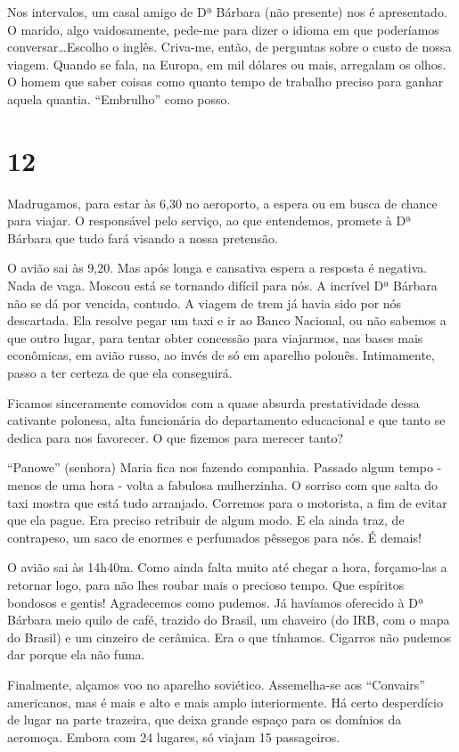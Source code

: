 Nos intervalos, um casal amigo de Dª Bárbara (não presente) nos é apresentado. O marido, algo vaidosamente, pede-me para dizer o idioma em que poderíamos conversar\ldots Escolho o inglês. Criva-me, então, de perguntas sobre o custo de nossa viagem. Quando se fala, na Europa, em mil dólares ou mais, arregalam os olhos. O homem que saber coisas como quanto tempo de trabalho preciso para ganhar aquela quantia. “Embrulho” como posso.

\section*{12 \adfflatleafright {}}
Madrugamos, para estar às 6,30 no aeroporto, a espera ou em busca de chance para viajar. O responsável pelo serviço, ao que entendemos, promete à Dª Bárbara que tudo fará visando a nossa pretensão.

O avião sai às 9,20. Mas após longa e cansativa espera a resposta é negativa. Nada de vaga. Moscou está se tornando difícil para nós. A incrível Dª Bárbara não se dá por vencida, contudo. A viagem de trem já havia sido por nós descartada. Ela resolve pegar um taxi e ir ao Banco Nacional, ou não sabemos a que outro lugar, para tentar obter concessão para viajarmos, nas bases mais econômicas, em avião russo, ao invés de só em aparelho polonês. Intimamente, passo a ter certeza de que ela conseguirá.

Ficamos sinceramente comovidos com a quase absurda prestatividade dessa cativante polonesa, alta funcionária do departamento educacional e que tanto se dedica para nos favorecer. O que fizemos para merecer tanto?

“Panowe” (senhora) Maria fica nos fazendo companhia. Passado algum tempo - menos de uma hora - volta a fabulosa mulherzinha. O sorriso com que salta do taxi mostra que está tudo arranjado. Corremos para o motorista, a fim de evitar que ela pague. Era preciso retribuir de algum modo. E ela ainda traz, de contrapeso, um saco de enormes e perfumados pêssegos para nós. É demais!

O avião sai às 14h40m. Como ainda falta muito até chegar a hora, forçamo-las a retornar logo, para não lhes roubar mais o precioso tempo. Que espíritos bondosos e gentis! Agradecemos como pudemos. Já havíamos oferecido à Dª Bárbara meio quilo de café, trazido do Brasil, um chaveiro (do IRB, com o mapa do Brasil) e um cinzeiro de cerâmica. Era o que tínhamos. Cigarros não pudemos dar porque ela não fuma.

Finalmente, alçamos voo no aparelho soviético. Assemelha-se aos “Convairs” americanos, mas é mais e alto e mais amplo interiormente. Há certo desperdício de lugar na parte trazeira, que deixa grande espaço para os domínios da aeromoça. Embora com 24 lugares, só viajam 15 passageiros.

